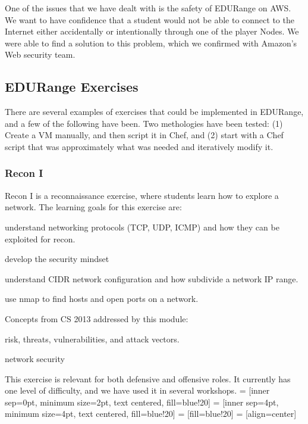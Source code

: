 One of the issues that we have dealt with is the safety of EDURange on AWS.  We want to have confidence 
that a student would not be able to connect to the Internet either accidentally or 
intentionally through one of the player Nodes.  We were able to find a solution to this problem, which 
we confirmed with Amazon's Web security team.

\subsection*{EDURange Exercises}
There are several examples of exercises that could be implemented in EDURange, and a few of the following
have been.  Two methologies have been tested: (1) Create a VM manually, and then script it in Chef, and (2)
start with a Chef script that was approximately what was needed and iteratively modify it.

\subsubsection{Recon I}
Recon I  is a reconnaissance exercise, where students learn how to explore a network.
The learning goals for this exercise are:
\begin{packenum}
\item understand networking protocols (TCP, UDP, ICMP) and how they can be exploited for recon.
\item develop the security mindset
\item understand CIDR network configuration and how subdivide a network IP range.
\item use nmap to find hosts and open ports on a network.
\end{packenum}
Concepts from CS 2013 addressed by this module:
\begin{packenum}
\item  risk, threats, vulnerabilities, and attack vectors.  
\item network security
\end{packenum}


This exercise is relevant for both defensive and offensive roles.  It currently has one level of difficulty,
and we have used it in several workshops.
\usetikzlibrary{arrows,decorations.pathmorphing,backgrounds,positioning,fit,petri}
 = [inner sep=0pt, minimum size=2pt, text centered, fill=blue!20]
 = [inner sep=4pt, minimum size=4pt, text centered, fill=blue!20]
 = [fill=blue!20]
 = [align=center]

